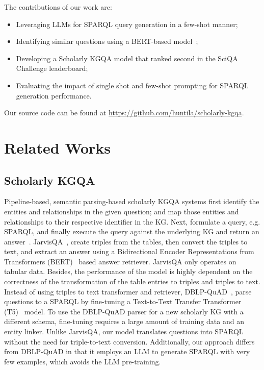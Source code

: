 \documentclass[
]{ceurart}
\begin{document}
The contributions of our work are:
\begin{itemize}
    \item Leveraging LLMs for SPARQL query generation in a few-shot manner;
    \item Identifying similar questions using a BERT-based model~\cite{KOCAMAN2021100058};
    \item Developing a Scholarly KGQA model that ranked second in the SciQA Challenge leaderboard;
    \item Evaluating the impact of single shot and few-shot prompting for SPARQL generation performance.
\end{itemize}

Our source code can be found at \url{https://github.com/huntila/scholarly-kgqa}.

\section{Related Works}\label{sota}
\subsection{Scholarly KGQA}\label{related-work-schkgqa}
Pipeline-based, semantic parsing-based scholarly KGQA systems first identify the entities and relationships in the given question; and map those entities and relationships to their respective identifier in the KG. Next, formulate a query, e.g. SPARQL, and finally execute the query against the underlying KG and return an answer~\cite{ZHANG20231}. JarvisQA~\cite{jaradeh2020question}, create triples from the tables, then convert the triples to text, and extract an answer using a Bidirectional Encoder Representations from Transformers (BERT)~\cite{bertDevlinCLT19} based answer retriever. JarvisQA only operates on tabular data. Besides, the performance of the model is highly dependent on the correctness of the transformation of the table entries to triples and triples to text. Instead of using triples to text transformer and retriever, DBLP-QuAD~\cite{banerjee2023dblp}, parse questions to a SPARQL by fine-tuning a Text-to-Text Transfer Transformer (T5)~\cite{t5raffel} model. To use the DBLP-QuAD parser for a new scholarly KG with a different schema, fine-tuning requires a large amount of training data and an entity linker. Unlike JarvisQA, our model translates questions into SPARQL without the need for triple-to-text conversion. Additionally, our approach differs from DBLP-QuAD in that it employs an LLM to generate SPARQL with very few examples, which avoids the LLM pre-training.
\end{document}
